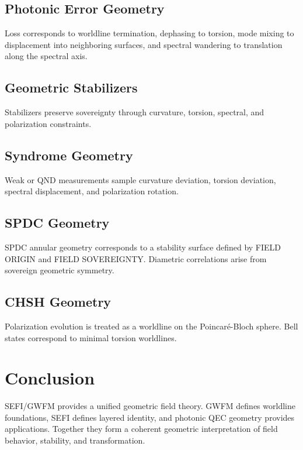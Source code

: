 \documentclass[12pt]{report}
\begin{document}
\section{Photonic Error Geometry}

Loss corresponds to worldline termination, dephasing to torsion, mode mixing to
displacement into neighboring surfaces, and spectral wandering to translation
along the spectral axis.

\section{Geometric Stabilizers}

Stabilizers preserve sovereignty through curvature, torsion, spectral, and
polarization constraints.

\section{Syndrome Geometry}

Weak or QND measurements sample curvature deviation, torsion deviation, spectral
displacement, and polarization rotation.

\section{SPDC Geometry}

SPDC annular geometry corresponds to a stability surface defined by FIELD ORIGIN
and FIELD SOVEREIGNTY. Diametric correlations arise from sovereign geometric
symmetry.

\section{CHSH Geometry}

Polarization evolution is treated as a worldline on the Poincaré-Bloch sphere.
Bell states correspond to minimal torsion worldlines.

\chapter{Conclusion}

SEFI/GWFM provides a unified geometric field theory. GWFM defines worldline
foundations, SEFI defines layered identity, and photonic QEC geometry provides
applications. Together they form a coherent geometric interpretation of field
behavior, stability, and transformation.
\end{document}
